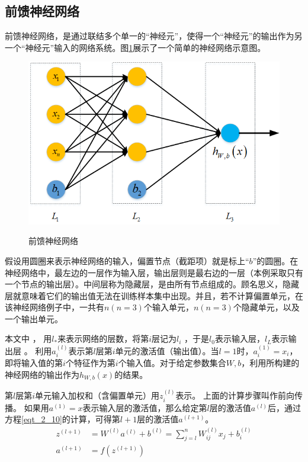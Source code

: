 \subsection{前馈神经网络}
前馈神经网络，是通过联结多个单一的“神经元”，使得一个“神经元”的输出作为另一个“神经元”输入的网络系统。图\ref{sec:fig_2_4}展示了一个简单的神经网络示意图。\par
\begin{figure}[!h]
	\centering
	\includegraphics[scale=0.7]{figures/chapter_2/fig_2_4}\label{sec:fig_2_4}
	\caption{前馈神经网络}\label{sec:fig_2_4}
\end{figure}
假设用圆圈来表示神经网络的输入，偏置节点（截距项）就是标上“$b$”的圆圈。在神经网络中，最左边的一层作为输入层，输出层则是最右边的一层（本例采取只有一个节点的输出层）。中间层称为隐藏层，是由所有节点组成的。顾名思义，隐藏层就意味着它们的输出值无法在训练样本集中出现。并且，若不计算偏置单元，在该神经网络例子中，一共有$n(n=3)$个输入单元，$n(n=3)$个隐藏单元，以及一个输出单元。\par

本文中 ， 用$l_{*}$来表示网络的层数，将第$i$层记为$l_i$ ，于是$l_{0}$表示输入层，$l_L$表示输出层 。
利用$a^{(l)}_i$表示第$l$层第$i$单元的激活值（输出值）。当$l=1$时，$a^{(1)}_i = x_i$，即将输入值的第$i$个特征作为第$i$个输入值。对于给定参数集合$W,b$，利用所构建的神经网络的输出作为$h_{W,b}(x)$的结果。\par
 
第$l$层第$i$单元输入加权和（含偏置单元）用$z^{(l)}_i$表示。
上面的计算步骤叫作前向传播。
如果用$a^{(1)} = x$表示输入层的激活值，那么给定第$l$层的激活值$a^{(l)}$后，通过方程\eqref{eqt_2_10}的计算，可得第$l+1$层的激活值$a^{(l+1)}$。
\begin{align}
	\label{eqt_2_10}
	z^{(l+1)} &= W^{(l)} a^{(l)} + b^{(l)}=\sum_{j=l}^n W^{(l)}_{ij} x_j + b^{(l)}_i\\
	a^{(l+1)} &= f(z^{(l+1)})
\end{align}

